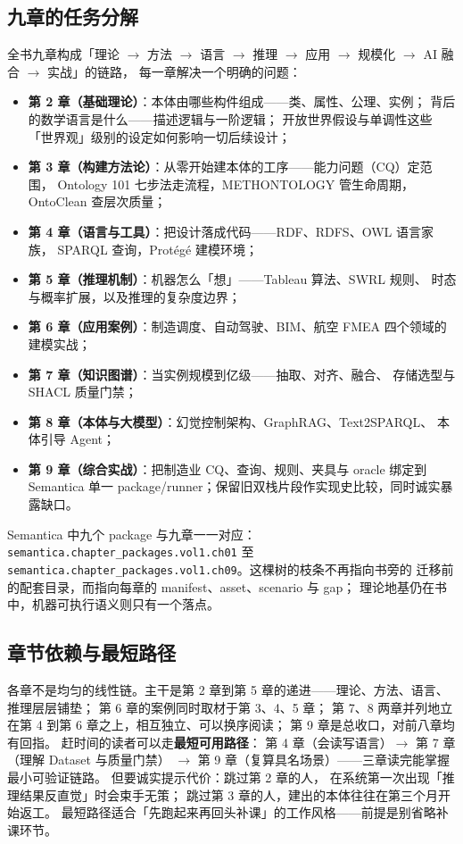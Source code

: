 \subsection{九章的任务分解}

全书九章构成「理论 \(\rightarrow\) 方法 \(\rightarrow\) 语言 \(\rightarrow\) 推理
\(\rightarrow\) 应用 \(\rightarrow\) 规模化 \(\rightarrow\) AI 融合 \(\rightarrow\) 实战」的链路，
每一章解决一个明确的问题：

\begin{itemize}
\item \textbf{第 2 章（基础理论）}：本体由哪些构件组成——类、属性、公理、实例；
      背后的数学语言是什么——描述逻辑与一阶逻辑；
      开放世界假设与单调性这些「世界观」级别的设定如何影响一切后续设计；
\item \textbf{第 3 章（构建方法论）}：从零开始建本体的工序——能力问题（CQ）定范围，
      Ontology 101 七步法走流程，METHONTOLOGY 管生命周期，OntoClean 查层次质量；
\item \textbf{第 4 章（语言与工具）}：把设计落成代码——RDF、RDFS、OWL 语言家族，
      SPARQL 查询，Protégé 建模环境；
\item \textbf{第 5 章（推理机制）}：机器怎么「想」——Tableau 算法、SWRL 规则、
      时态与概率扩展，以及推理的复杂度边界；
\item \textbf{第 6 章（应用案例）}：制造调度、自动驾驶、BIM、航空 FMEA
      四个领域的建模实战；
\item \textbf{第 7 章（知识图谱）}：当实例规模到亿级——抽取、对齐、融合、
      存储选型与 SHACL 质量门禁；
\item \textbf{第 8 章（本体与大模型）}：幻觉控制架构、GraphRAG、Text2SPARQL、
      本体引导 Agent；
\item \textbf{第 9 章（综合实战）}：把制造业 CQ、查询、规则、夹具与 oracle
      绑定到 Semantica 单一 package/runner；保留旧双栈片段作实现史比较，同时诚实暴露缺口。
\end{itemize}

Semantica 中九个 package 与九章一一对应：
\texttt{semantica.chapter\_packages.vol1.ch01} 至
\texttt{semantica.chapter\_packages.vol1.ch09}。这棵树的枝条不再指向书旁的
迁移前的配套目录，而指向每章的 manifest、asset、scenario 与 gap；
理论地基仍在书中，机器可执行语义则只有一个落点。

\subsection{章节依赖与最短路径}

各章不是均匀的线性链。主干是第 2 章到第 5 章的递进——理论、方法、语言、推理层层铺垫；
第 6 章的案例同时取材于第 3、4、5 章；
第 7、8 两章并列地立在第 4 到第 6 章之上，相互独立、可以换序阅读；
第 9 章是总收口，对前八章均有回指。
赶时间的读者可以走\textbf{最短可用路径}：
第 4 章（会读写语言）\(\rightarrow\) 第 7 章（理解 Dataset 与质量门禁）
\(\rightarrow\) 第 9 章（复算具名场景）——三章读完能掌握最小可验证链路。
但要诚实提示代价：跳过第 2 章的人，
在系统第一次出现「推理结果反直觉」时会束手无策；
跳过第 3 章的人，建出的本体往往在第三个月开始返工。
最短路径适合「先跑起来再回头补课」的工作风格——前提是别省略补课环节。

